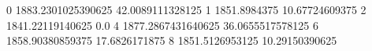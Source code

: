 0 1883.2301025390625 42.0089111328125
1 1851.8984375 10.67724609375
2 1841.22119140625 0.0
4 1877.2867431640625 36.0655517578125
6 1858.90380859375 17.6826171875
8 1851.5126953125 10.29150390625
